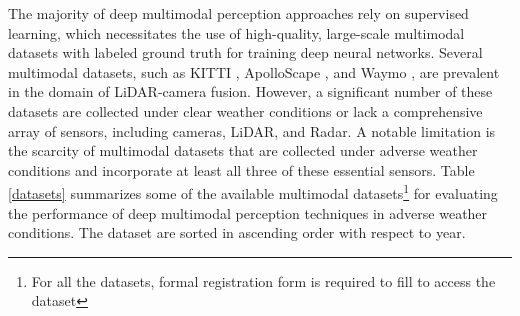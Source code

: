 \documentclass[report.tex]{subfiles}
\begin{document}



    The majority of deep multimodal perception approaches rely on supervised learning, which necessitates the use of high-quality, large-scale multimodal datasets with labeled ground truth for training deep neural networks. Several multimodal datasets, such as KITTI \cite{geiger2012we}, ApolloScape \cite{huang2019apolloscape}, and Waymo \cite{sun2020scalability}, are prevalent in the domain of LiDAR-camera fusion. However, a significant number of these datasets are collected under clear weather conditions or lack a comprehensive array of sensors, including cameras, LiDAR, and Radar. A notable limitation is the scarcity of multimodal datasets that are collected under adverse weather conditions and incorporate at least all three of these essential sensors. Table \ref{datasets} summarizes some of the available multimodal datasets\footnote{For all the datasets, formal registration form is required to fill to access the dataset} for evaluating the performance of deep multimodal perception techniques in adverse weather conditions. The dataset are sorted in ascending order with respect to year.
\end{document}
